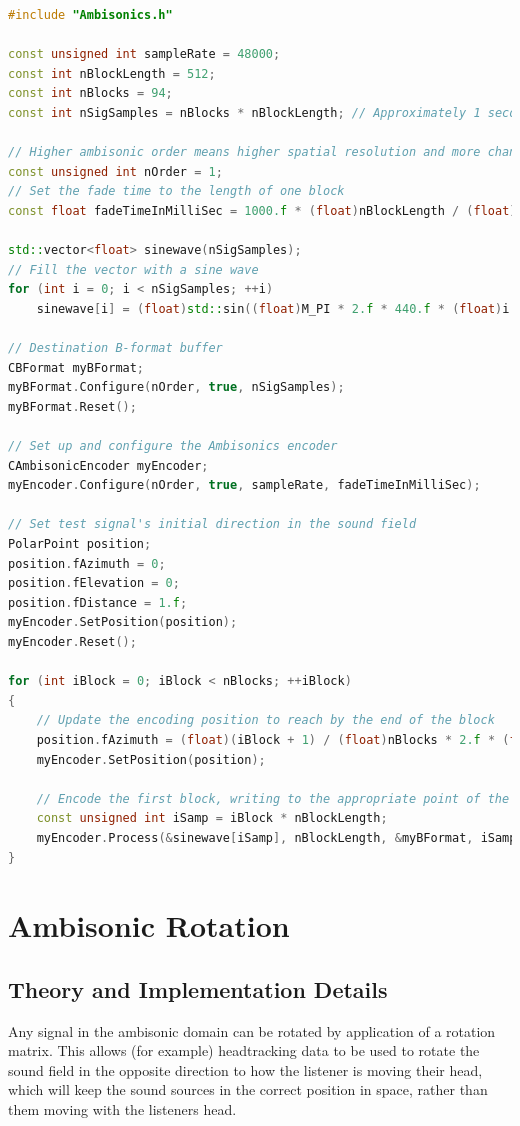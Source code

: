\documentclass[12pt]{report}
\begin{document}
\begin{lstlisting}[language=C++]
#include "Ambisonics.h"

const unsigned int sampleRate = 48000;
const int nBlockLength = 512;
const int nBlocks = 94;
const int nSigSamples = nBlocks * nBlockLength; // Approximately 1 second @ 48 kHz

// Higher ambisonic order means higher spatial resolution and more channels required
const unsigned int nOrder = 1;
// Set the fade time to the length of one block
const float fadeTimeInMilliSec = 1000.f * (float)nBlockLength / (float)sampleRate;

std::vector<float> sinewave(nSigSamples);
// Fill the vector with a sine wave
for (int i = 0; i < nSigSamples; ++i)
    sinewave[i] = (float)std::sin((float)M_PI * 2.f * 440.f * (float)i / (float)sampleRate);

// Destination B-format buffer
CBFormat myBFormat;
myBFormat.Configure(nOrder, true, nSigSamples);
myBFormat.Reset();

// Set up and configure the Ambisonics encoder
CAmbisonicEncoder myEncoder;
myEncoder.Configure(nOrder, true, sampleRate, fadeTimeInMilliSec);

// Set test signal's initial direction in the sound field
PolarPoint position;
position.fAzimuth = 0;
position.fElevation = 0;
position.fDistance = 1.f;
myEncoder.SetPosition(position);
myEncoder.Reset();

for (int iBlock = 0; iBlock < nBlocks; ++iBlock)
{
    // Update the encoding position to reach by the end of the block
    position.fAzimuth = (float)(iBlock + 1) / (float)nBlocks * 2.f * (float)M_PI;
    myEncoder.SetPosition(position);

    // Encode the first block, writing to the appropriate point of the destination buffer
    const unsigned int iSamp = iBlock * nBlockLength;
    myEncoder.Process(&sinewave[iSamp], nBlockLength, &myBFormat, iSamp);
}
\end{lstlisting}

\section{Ambisonic Rotation}\label{AmbiRotation}

\subsection{Theory and Implementation Details}

Any signal in the ambisonic domain can be rotated by application of a rotation matrix.
This allows (for example) headtracking data to be used to rotate the sound field in the opposite direction to how the listener is moving their head, which will keep the sound sources in the correct position in space, rather than them moving with the listeners head.
\end{document}
